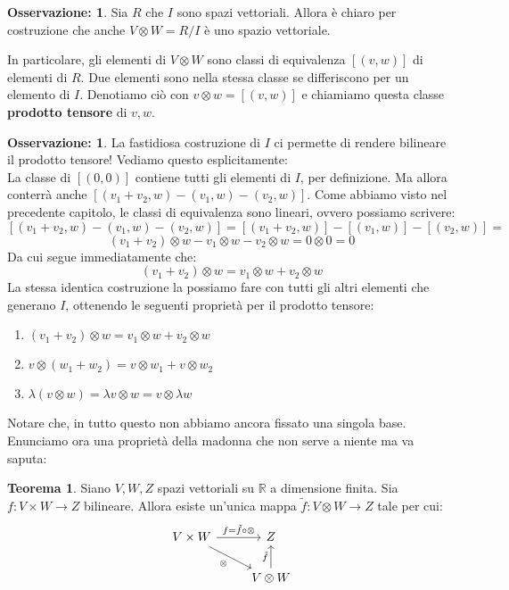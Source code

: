 \documentclass[12pt,a4paper]{report}
\theoremstyle{definition}
\theoremstyle{Theorem}
\newtheorem{Theo}[Def]{Teorema}
\theoremstyle{definition}
\theoremstyle{definition}
\theoremstyle{definition}
\newtheorem{Obs}[Def]{Osservazione:}
\begin{document}
	\begin{Obs}
		Sia $R$ che $I$ sono spazi vettoriali. Allora è chiaro per costruzione che anche $V\otimes W=R/I$ è uno spazio vettoriale.
	\end{Obs}
	In particolare, gli elementi di $V\otimes W$ sono classi di equivalenza $[(v,w)]$ di elementi di $R$. Due elementi sono nella stessa classe se differiscono per un elemento di $I$. Denotiamo ciò con $v\otimes w=[(v,w)]$ e chiamiamo questa classe \textbf{prodotto tensore} di $v,w$.
	\begin{Obs}
		La fastidiosa costruzione di $I$ ci permette di rendere bilineare il prodotto tensore! Vediamo questo esplicitamente:\\
		La classe di $[(0,0)]$ contiene tutti gli elementi di $I$, per definizione. Ma allora conterrà anche $[(v_1+v_2,w)-(v_1,w)-(v_2,w)]$. Come abbiamo visto nel precedente capitolo, le classi di equivalenza sono lineari, ovvero possiamo scrivere:
		$$[(v_1+v_2,w)-(v_1,w)-(v_2,w)]=[(v_1+v_2,w)]-[(v_1,w)]-[(v_2,w)]=$$
		$$(v_1+v_2)\otimes w-v_1\otimes w-v_2\otimes w=0\otimes 0=0$$
		Da cui segue immediatamente che:
		$$(v_1+v_2)\otimes w=v_1\otimes w+v_2\otimes w$$
		La stessa identica costruzione la possiamo fare con tutti gli altri elementi che generano $I$, ottenendo le seguenti proprietà per il prodotto tensore:
		\begin{enumerate}
			\item $(v_1+v_2)\otimes w=v_1\otimes w+v_2\otimes w$
			\item $v\otimes (w_1+w_2)=v\otimes w_1+v\otimes w_2$
			\item $\lambda(v\otimes w)=\lambda v\otimes w=v\otimes \lambda w$
		\end{enumerate}
	\end{Obs}
	Notare che, in tutto questo non abbiamo ancora fissato una singola base.
	Enunciamo ora una proprietà della madonna che non serve a niente ma va saputa:
	\begin{Theo}
		Siano $V,W,Z$ spazi vettoriali su $\mathbb{R}$ a dimensione finita. Sia $f:V\times W\rightarrow Z$ bilineare. Allora esiste un'unica mappa $\tilde{f}:V\otimes W \rightarrow Z$ tale per cui:
		\[
		\begin{tikzcd}
			V\times W \arrow{r}{f=\tilde{f}\circ \otimes} \arrow[swap]{dr}{\otimes} & Z \\
			& V\otimes W \arrow{u}{\tilde{f}}
		\end{tikzcd}
		\]
	\end{Theo}
\end{document}
